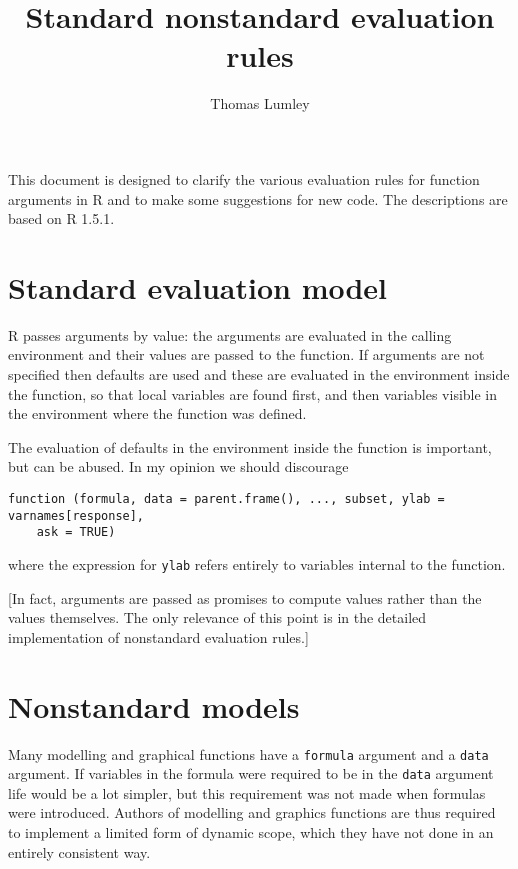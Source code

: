 \documentclass[11pt]{article}
\title{Standard nonstandard evaluation rules}
\author{Thomas Lumley}
\newif\ifpdf
\begin{document}
\ifpdf
\DeclareGraphicsExtensions{.pdf, .jpg, .tif}
\else
{}
\fi

\maketitle

This document is designed to clarify the various evaluation rules 
for function arguments in R and to make some suggestions for new code. The descriptions are based on R 1.5.1.

\section{Standard evaluation model}
R passes arguments by value: the arguments are evaluated in the calling environment and their values are passed to the function.  If arguments are not specified then defaults are used and these are evaluated in the environment inside the function,  so that local variables are found first, and then variables visible in the environment where the function was defined. 

The evaluation of defaults in the environment inside the function is important, but can be abused.  In my opinion we should discourage
\begin{verbatim}
function (formula, data = parent.frame(), ..., subset, ylab = varnames[response], 
    ask = TRUE) 
\end{verbatim}
where the expression for \texttt{ylab} refers entirely to variables internal to the function.  


[In fact, arguments are passed as promises to compute values rather than the values themselves. The only relevance of  this point is in the detailed implementation of nonstandard evaluation rules.]

\section{Nonstandard models}

Many modelling and graphical functions have a \texttt{formula}
argument and a \texttt{data} argument.  If variables in the formula
were required to be in the \texttt{data} argument life would be a lot
simpler, but this requirement was not made when formulas were
introduced.  Authors of modelling and graphics functions are thus
required to implement a limited form of dynamic scope, which they have
not done in an entirely consistent way.
\end{document}

